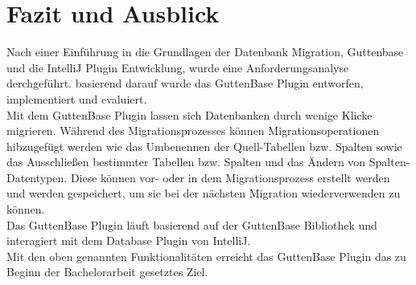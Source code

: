 \chapter{Fazit und Ausblick}


Nach einer Einführung in die Grundlagen der Datenbank Migration, Guttenbase und die IntelliJ Plugin Entwicklung, wurde eine Anforderungsanalyse derchgeführt. basierend darauf wurde das GuttenBase Plugin entworfen, implementiert und evaluiert. \\
Mit dem GuttenBase Plugin lassen sich Datenbanken durch wenige Klicke migrieren. Während des Migrationsprozesses können Migrationsoperationen hibzugefügt werden wie das Umbenennen der Quell-Tabellen bzw. Spalten sowie das Ausschließen bestimmter Tabellen bzw. Spalten und das Ändern von Spalten-Datentypen. Diese können vor- oder in dem  Migrationsprozess erstellt werden und werden gespeichert, um sie bei der nächsten Migration wiederverwenden zu können.\\
Das GuttenBase Plugin läuft basierend auf der GuttenBase Bibliothek und interagiert mit dem Database Plugin von IntelliJ.\\
Mit den oben genannten Funktionalitäten erreicht das GuttenBase Plugin das zu Beginn der Bachelorarbeit gesetztes Ziel.